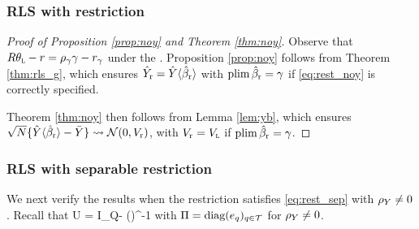 \documentclass[11pt]{article}
\theoremstyle{definition}
\begin{document}
\subsubsection{RLS with  {\go} restriction}
\begin{proof}[Proof of Proposition \ref{prop:noy} and Theorem \ref{thm:noy}]
Observe that $R\theta_{\textsc{l}} -r = \rho_\gamma \gamma - r_\gamma$ under the \gor.
Proposition \ref{prop:noy} follows from Theorem \ref{thm:rls_g}, which ensures $\hat Y_{\textup{r}} = \hat Y\langle \hat\beta_{\textup{r}}\rangle $ with $\textup{plim\,} \hat\beta_{\textup{r}} = \gamma$ if \eqref{eq:rest_noy} is correctly specified.

Theorem \ref{thm:noy} then follows from Lemma \ref{lem:yb}, which ensures $\sqrt N\{\hat Y\langle \hat\beta_{\textup{r}}\rangle  - \bar Y\} \rightsquigarrow \mathcal{N}(0, V_{\textup{r}})$, with $V_{\textup{r}} = V_{\textsc{l}}$ if $\textup{plim\,} \hat\beta_{\textup{r}} = \gamma$. 
\end{proof}

\subsubsection{RLS with separable restriction}
We next verify the results when the restriction satisfies \eqref{eq:rest_sep} with $\rho_Y \neq 0$. 
Recall that 
\begina
U =  I_Q-   \einv \rhyt (\rhy \einv \rhyt)^{-1} \rhy
\enda 
with $\Pi = \text{diag}(e_q)_{q\in\mathcal{T}}$
for $\rho_Y \neq 0$. 
\end{document}
